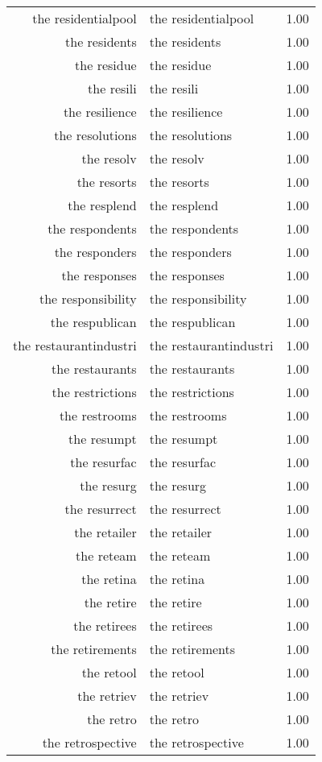 \begin{table}[ht]
\begin{tabular}{rlr}
  the residentialpool & the residentialpool & 1.00 \\ 
  the residents & the residents & 1.00 \\ 
  the residue & the residue & 1.00 \\ 
  the resili & the resili & 1.00 \\ 
  the resilience & the resilience & 1.00 \\ 
  the resolutions & the resolutions & 1.00 \\ 
  the resolv & the resolv & 1.00 \\ 
  the resorts & the resorts & 1.00 \\ 
  the resplend & the resplend & 1.00 \\ 
  the respondents & the respondents & 1.00 \\ 
  the responders & the responders & 1.00 \\ 
  the responses & the responses & 1.00 \\ 
  the responsibility & the responsibility & 1.00 \\ 
  the respublican & the respublican & 1.00 \\ 
  the restaurantindustri & the restaurantindustri & 1.00 \\ 
  the restaurants & the restaurants & 1.00 \\ 
  the restrictions & the restrictions & 1.00 \\ 
  the restrooms & the restrooms & 1.00 \\ 
  the resumpt & the resumpt & 1.00 \\ 
  the resurfac & the resurfac & 1.00 \\ 
  the resurg & the resurg & 1.00 \\ 
  the resurrect & the resurrect & 1.00 \\ 
  the retailer & the retailer & 1.00 \\ 
  the reteam & the reteam & 1.00 \\ 
  the retina & the retina & 1.00 \\ 
  the retire & the retire & 1.00 \\ 
  the retirees & the retirees & 1.00 \\ 
  the retirements & the retirements & 1.00 \\ 
  the retool & the retool & 1.00 \\ 
  the retriev & the retriev & 1.00 \\ 
  the retro & the retro & 1.00 \\ 
  the retrospective & the retrospective & 1.00 \\ 

\end{tabular}
\end{table}
